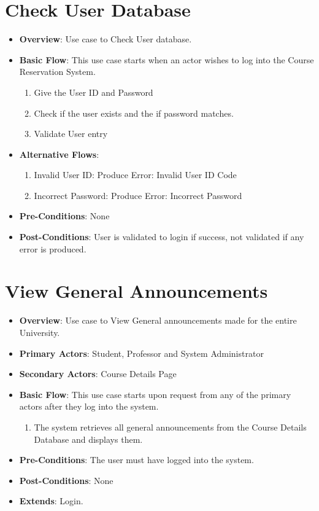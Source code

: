 \documentclass[12pt, a4]{report}
\begin{document}
\section{Check User Database}
\begin{itemize}
    \item \textbf{Overview}: Use case to Check User database.
    \item \textbf{Basic Flow}: This use case starts when an actor wishes to log into the Course Reservation System.
        \begin{enumerate}
            \item Give the User ID and Password
            \item Check if the user exists and the if password matches.
            \item Validate User entry
        \end{enumerate}
    \item \textbf{Alternative Flows}:
        \begin{enumerate}
            \item Invalid User ID: Produce Error: Invalid User ID Code
            \item Incorrect Password: Produce Error: Incorrect Password
        \end{enumerate}
    \item \textbf{Pre-Conditions}: None
    \item \textbf{Post-Conditions}: User is validated to login if success, not validated if any error is produced.
\end{itemize}


\section{View General Announcements}
\begin{itemize}
    \item \textbf{Overview}: Use case to View General announcements made for the entire University.
    \item \textbf{Primary Actors}: Student, Professor and System Administrator
    \item \textbf{Secondary Actors}: Course Details Page
    \item \textbf{Basic Flow}: This use case starts upon request from any of the primary actors after they log into the system.
        \begin{enumerate}
            \item The system retrieves all general announcements from the Course Details Database and displays them.
        \end{enumerate}
    \item \textbf{Pre-Conditions}: The user must have logged into the system.
    \item \textbf{Post-Conditions}: None
    \item \textbf{Extends}: Login.
\end{itemize}
\end{document}
